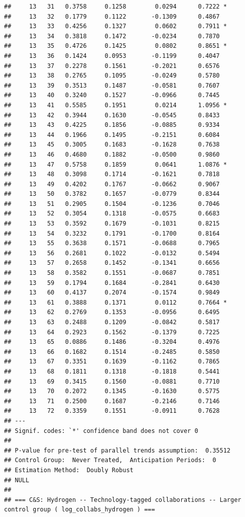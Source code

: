 \documentclass[
]{article}
\begin{document}
\begin{verbatim}
##     13   31   0.3758     0.1258        0.0294      0.7222 *
##     13   32   0.1779     0.1122       -0.1309      0.4867  
##     13   33   0.4256     0.1327        0.0602      0.7911 *
##     13   34   0.3818     0.1472       -0.0234      0.7870  
##     13   35   0.4726     0.1425        0.0802      0.8651 *
##     13   36   0.1424     0.0953       -0.1199      0.4047  
##     13   37   0.2278     0.1561       -0.2021      0.6576  
##     13   38   0.2765     0.1095       -0.0249      0.5780  
##     13   39   0.3513     0.1487       -0.0581      0.7607  
##     13   40   0.3240     0.1527       -0.0966      0.7445  
##     13   41   0.5585     0.1951        0.0214      1.0956 *
##     13   42   0.3944     0.1630       -0.0545      0.8433  
##     13   43   0.4225     0.1856       -0.0885      0.9334  
##     13   44   0.1966     0.1495       -0.2151      0.6084  
##     13   45   0.3005     0.1683       -0.1628      0.7638  
##     13   46   0.4680     0.1882       -0.0500      0.9860  
##     13   47   0.5758     0.1859        0.0641      1.0876 *
##     13   48   0.3098     0.1714       -0.1621      0.7818  
##     13   49   0.4202     0.1767       -0.0662      0.9067  
##     13   50   0.3782     0.1657       -0.0779      0.8344  
##     13   51   0.2905     0.1504       -0.1236      0.7046  
##     13   52   0.3054     0.1318       -0.0575      0.6683  
##     13   53   0.3592     0.1679       -0.1031      0.8215  
##     13   54   0.3232     0.1791       -0.1700      0.8164  
##     13   55   0.3638     0.1571       -0.0688      0.7965  
##     13   56   0.2681     0.1022       -0.0132      0.5494  
##     13   57   0.2658     0.1452       -0.1341      0.6656  
##     13   58   0.3582     0.1551       -0.0687      0.7851  
##     13   59   0.1794     0.1684       -0.2841      0.6430  
##     13   60   0.4137     0.2074       -0.1574      0.9849  
##     13   61   0.3888     0.1371        0.0112      0.7664 *
##     13   62   0.2769     0.1353       -0.0956      0.6495  
##     13   63   0.2488     0.1209       -0.0842      0.5817  
##     13   64   0.2923     0.1562       -0.1379      0.7225  
##     13   65   0.0886     0.1486       -0.3204      0.4976  
##     13   66   0.1682     0.1514       -0.2485      0.5850  
##     13   67   0.3351     0.1639       -0.1162      0.7865  
##     13   68   0.1811     0.1318       -0.1818      0.5441  
##     13   69   0.3415     0.1560       -0.0881      0.7710  
##     13   70   0.2072     0.1345       -0.1630      0.5775  
##     13   71   0.2500     0.1687       -0.2146      0.7146  
##     13   72   0.3359     0.1551       -0.0911      0.7628  
## ---
## Signif. codes: `*' confidence band does not cover 0
## 
## P-value for pre-test of parallel trends assumption:  0.35512
## Control Group:  Never Treated,  Anticipation Periods:  0
## Estimation Method:  Doubly Robust
## NULL
## 
## === C&S: Hydrogen -- Technology-tagged collaborations -- Larger control group ( log_collabs_hydrogen ) ===
\end{verbatim}
\end{document}
